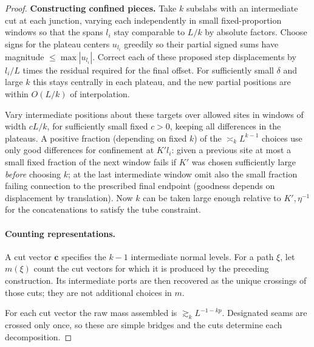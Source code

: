 \begin{proof}
\textbf{Constructing confined pieces.}
Take \(k\) subslabs with an intermediate cut at each junction, varying each independently in small fixed-proportion windows so that the spans \(l_i\) stay comparable to \(L/k\) by absolute factors. Choose signs for the plateau centers \(u_{l_i}\) greedily so their partial signed sums have magnitude \(\le\max |u_{l_i}|\). Correct each of these proposed step displacements by \(l_i/L\) times the residual required for the final offset. For sufficiently small \(\delta\) and large \(k\) this stays centrally in each plateau, and the new partial positions are within \(O(L/k)\) of interpolation. 

Vary intermediate positions about these targets over allowed sites in windows of width \(cL/k\), for sufficiently small fixed \(c>0\), keeping all differences in the plateaus. A positive fraction (depending on fixed \(k\)) of the \(\asymp_k L^{k-1}\) choices use only good differences for confinement at \(K'l_i\): given a previous site at most a small fixed fraction of the next window fails if \(K'\) was chosen sufficiently large \emph{before} choosing \(k\); at the last intermediate window omit also the small fraction failing connection to the prescribed final endpoint (goodness depends on displacement by translation). Now \(k\) can be taken large enough relative to \(K',\eta^{-1}\) for the concatenations to satisfy the tube constraint.

\paragraph{Counting representations.}
A cut vector \(\mathbf c\) specifies the \(k-1\) intermediate normal
levels. For a path \(\xi\), let \(m(\xi)\) count the cut vectors for which
it is produced by the preceding construction. Its intermediate ports
are then recovered as the unique crossings of those cuts; they are not
additional choices in \(m\).

For each cut vector the raw mass assembled is \(\gtrsim_k L^{-1-kp}\). Designated seams are crossed only once, so these are simple bridges and the cuts determine each decomposition.


\end{proof}
